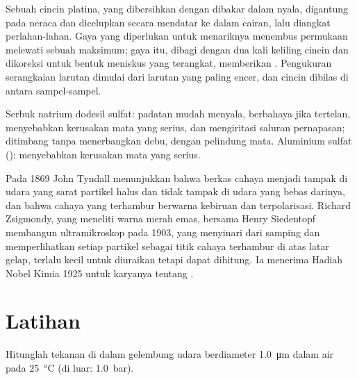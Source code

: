 \begin{inthelab}
Sebuah cincin platina, yang dibersihkan dengan dibakar dalam nyala, digantung
pada neraca dan dicelupkan secara mendatar ke dalam cairan, lalu diangkat
perlahan-lahan. Gaya yang diperlukan untuk menariknya menembus permukaan
melewati sebuah maksimum; gaya itu, dibagi dengan dua kali keliling cincin dan
dikoreksi untuk bentuk meniskus yang terangkat, memberikan .
Pengukuran serangkaian larutan  dimulai dari larutan yang paling
encer, dan cincin dibilas di antara sampel-sampel.
\end{inthelab}

\begin{safety}{}
Serbuk natrium dodesil sulfat: padatan mudah menyala, berbahaya jika tertelan,
menyebabkan kerusakan mata yang serius, dan mengiritasi saluran pernapasan;
ditimbang tanpa menerbangkan debu, dengan pelindung mata. Aluminium sulfat
(): menyebabkan kerusakan mata yang serius.
\end{safety}

\begin{history}
Pada 1869 John Tyndall menunjukkan bahwa berkas cahaya menjadi tampak di udara
yang sarat partikel halus dan tidak tampak di udara yang bebas darinya, dan bahwa
cahaya yang terhambur berwarna kebiruan dan terpolarisasi. Richard Zsigmondy,
yang meneliti warna merah  emas, bersama Henry Siedentopf membangun
ultramikroskop pada 1903, yang menyinari  dari samping dan memperlihatkan
setiap partikel sebagai titik cahaya terhambur di atas latar gelap, terlalu
kecil untuk diuraikan tetapi dapat dihitung. Ia menerima Hadiah Nobel Kimia
1925 untuk karyanya tentang .
\end{history}

\section{Latihan}

\begin{exercise}[$\star$]\label{exo:b3:colloids:1}
Hitunglah tekanan di dalam gelembung udara berdiameter \qty{1.0}{\micro m} dalam air pada
\qty{25}{\celsius} (di luar: \qty{1.0}{bar}).
\end{exercise}

